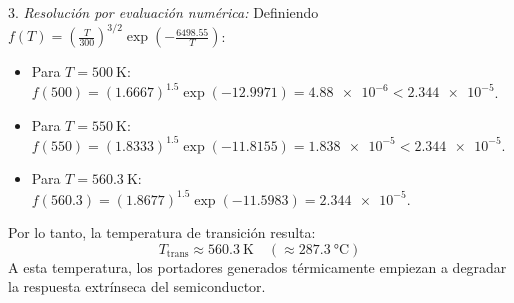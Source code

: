 \begin{problema}
3. \textit{Resolución por evaluación numérica:}
Definiendo $f(T) = \left( \frac{T}{300} \right)^{3/2} \exp\left( -\frac{6498.55}{T} \right)$:
\begin{itemize}
    \item Para $T = \SI{500}{\kelvin}$: $f(500) = (1.6667)^{1.5} \exp(-12.9971) = \num{4.88e-6} < \num{2.344e-5}$.
    \item Para $T = \SI{550}{\kelvin}$: $f(550) = (1.8333)^{1.5} \exp(-11.8155) = \num{1.838e-5} < \num{2.344e-5}$.
    \item Para $T = \SI{560.3}{\kelvin}$: $f(560.3) = (1.8677)^{1.5} \exp(-11.5983) = \num{2.344e-5}$.
\end{itemize}

Por lo tanto, la temperatura de transición resulta:
\[
T_{\text{trans}} \approx \SI{560.3}{\kelvin} \quad (\approx \SI{287.3}{\celsius})
\]
A esta temperatura, los portadores generados térmicamente empiezan a degradar la respuesta extrínseca del semiconductor.
\end{problema}

